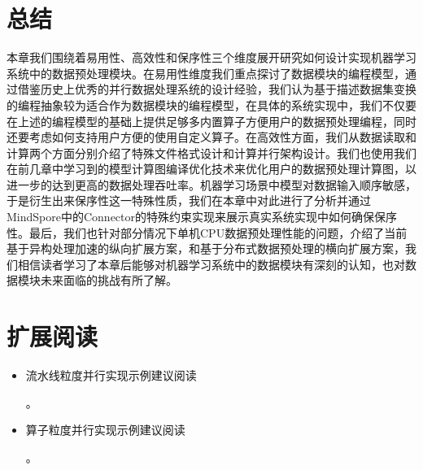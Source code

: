 \documentclass[letterpaper,10pt,english]{sphinxmanual}
\begin{document}
\section{总结}
\label{\detokenize{chapter_data_processing/summary:id1}}\label{\detokenize{chapter_data_processing/summary::doc}}
\sphinxAtStartPar
本章我们围绕着易用性、高效性和保序性三个维度展开研究如何设计实现机器学习系统中的数据预处理模块。在易用性维度我们重点探讨了数据模块的编程模型，通过借鉴历史上优秀的并行数据处理系统的设计经验，我们认为基于描述数据集变换的编程抽象较为适合作为数据模块的编程模型，在具体的系统实现中，我们不仅要在上述的编程模型的基础上提供足够多内置算子方便用户的数据预处理编程，同时还要考虑如何支持用户方便的使用自定义算子。在高效性方面，我们从数据读取和计算两个方面分别介绍了特殊文件格式设计和计算并行架构设计。我们也使用我们在前几章中学习到的模型计算图编译优化技术来优化用户的数据预处理计算图，以进一步的达到更高的数据处理吞吐率。机器学习场景中模型对数据输入顺序敏感，于是衍生出来保序性这一特殊性质，我们在本章中对此进行了分析并通过MindSpore中的Connector的特殊约束实现来展示真实系统实现中如何确保保序性。最后，我们也针对部分情况下单机CPU数据预处理性能的问题，介绍了当前基于异构处理加速的纵向扩展方案，和基于分布式数据预处理的横向扩展方案，我们相信读者学习了本章后能够对机器学习系统中的数据模块有深刻的认知，也对数据模块未来面临的挑战有所了解。


\section{扩展阅读}
\label{\detokenize{chapter_data_processing/summary:id2}}\begin{itemize}
\item {} 
\sphinxAtStartPar
流水线粒度并行实现示例建议阅读 %
\begin{footnote}[39]\sphinxAtStartFootnote
{}
%
\end{footnote}。

\item {} 
\sphinxAtStartPar
算子粒度并行实现示例建议阅读
%
\begin{footnote}[40]\sphinxAtStartFootnote
{}
%
\end{footnote}。

\end{itemize}
\end{document}
